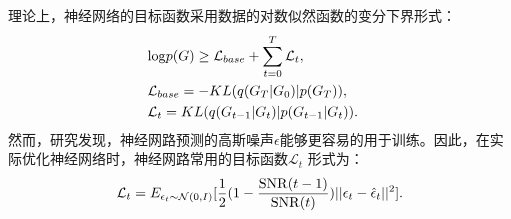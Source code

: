 理论上，神经网络的目标函数采用数据的对数似然函数的变分下界形式：
\begin{eqnarray}
    &{\rm log}p(G) \geq \mathcal{L}_{base} + \sum_{t=0}^T \mathcal{L}_t,& \\
    &\mathcal{L}_{base} = -KL(q(G_T|G_0)|p(G_T)),& \\
    &\mathcal{L}_t = KL(q(G_{t-1}|G_t)|p(G_{t-1}|G_t)). &
\end{eqnarray}
然而，研究发现，神经网路预测的高斯噪声$\epsilon$能够更容易的用于训练。因此，在实际优化神经网络时，神经网路常用的目标函数$\mathcal{L}_t$ \cite{vaediff_kingma_21}形式为：
\begin{equation}
    \mathcal{L}_t = E_{\epsilon_t \sim \mathcal{N}(0, I)}[\frac{1}{2}(1- \frac{{\rm SNR}(t-1)}{{\rm SNR}(t)})||\epsilon_t - \hat{\epsilon}_t||^2].
\end{equation}

